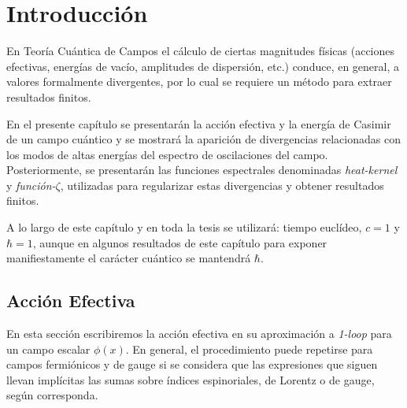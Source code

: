 \chapter{Introducción}


En Teoría Cuántica de Campos el cálculo de ciertas magnitudes físicas (acciones efectivas, energías de vacío, amplitudes de dispersión, etc.) conduce, en general, a valores formalmente divergentes, por lo cual se requiere un método para extraer resultados finitos. 

{\red En el presente capítulo se presentarán la acción efectiva y la energía de Casimir de un campo cuántico y se mostrará la aparición de divergencias relacionadas con los modos de altas energías del espectro de oscilaciones del campo. Posteriormente, se presentarán las funciones espectrales denominadas {\it heat-kernel} y {\it función-$\zeta$}, utilizadas para regularizar estas divergencias y obtener resultados finitos.}

A lo largo de este capítulo y en toda la tesis se utilizará: tiempo euclídeo, $c=1$ y $\hbar =1$, aunque en algunos resultados de este capítulo para exponer manifiestamente el carácter cuántico se mantendrá $\hbar$.

\section{Acción Efectiva}

{\red En esta sección escribiremos la acción efectiva en su aproximación a {\it 1-loop} para un campo escalar $\phi(x)$. En general, el procedimiento puede repetirse para campos fermiónicos y de gauge si se considera que las expresiones que siguen llevan implícitas las sumas sobre índices espinoriales, de Lorentz o de gauge, según corresponda.}

